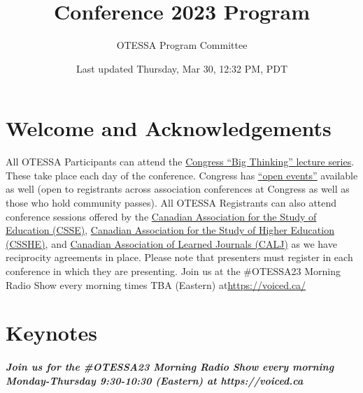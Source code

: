 \documentclass[
]{book}
\title{Conference 2023 Program}
\author{OTESSA Program Committee}
\date{Last updated Thursday, Mar 30, 12:32 PM, PDT}
\begin{document}
\maketitle

{
\setcounter{tocdepth}{1}
\tableofcontents
}
\hypertarget{welcome-and-acknowledgements}{%
\chapter*{Welcome and Acknowledgements}\label{welcome-and-acknowledgements}}

All OTESSA Participants can attend the \href{https://www.federationhss.ca/en/congress/congress-2022/open-programming}{Congress ``Big Thinking'' lecture series}. These take place each day of the conference. Congress has \href{https://www.federationhss.ca/en/congress/congress-2022/calendar-open-events}{``open events''} available as well (open to registrants across association conferences at Congress as well as those who hold community passes).
All OTESSA Registrants can also attend conference sessions offered by the \href{https://csse-scee.ca/}{Canadian Association for the Study of Education (CSSE)}, \href{https://csshe-scees.ca/}{Canadian Association for the Study of Higher Education (CSSHE)}, and \href{https://www.calj-acrs.ca/}{Canadian Association of Learned Journals (CALJ)} as we have reciprocity agreements in place. Please note that presenters must register in each conference in which they are presenting.
Join us at the \#OTESSA23 Morning Radio Show every morning times TBA (Eastern) at\url{https://voiced.ca/}

\hypertarget{keynotes}{%
\chapter*{Keynotes}\label{keynotes}}

\begin{protip}
\hypertarget{join-us-for-the-otessa23-morning-radio-show-every-morning-monday-thursday-930-1030-eastern-at-httpsvoiced.ca}{%
\paragraph{Join us for the \#OTESSA23 Morning Radio Show every morning
Monday-Thursday 9:30-10:30 (Eastern) at
https://voiced.ca}\label{join-us-for-the-otessa23-morning-radio-show-every-morning-monday-thursday-930-1030-eastern-at-httpsvoiced.ca}}
\end{protip}
\end{document}
